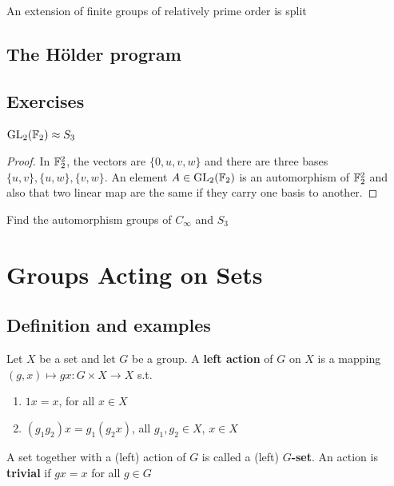 \documentclass[11pt]{article}
\begin{document}
\begin{theorem}
An extension of finite groups of relatively prime order is split
\end{theorem}
\subsection{The Hölder program}
\label{sec:org2b9131e}

\subsection{Exercises}
\label{sec:org59a980c}
\begin{exercise}
\label{ex3.3}
\(\operatorname{GL}_2(\mathbb{F}_2)\approx S_3\)
\end{exercise}

\begin{proof}
In \(\mathbb{F}_2^2\), the vectors are \(\{0,u,v,w\}\) and there are three bases \(\{u,v\},\{u,w\},\{v,w\}\). An
element \(A\in\operatorname{GL}_2(\mathbb{F}_2)\) is an automorphism of \(\mathbb{F}_2^2\) and also that two linear map are the same
if they carry one basis to another.
\end{proof}

\begin{exercise}
Find the automorphism groups of \(C_\infty\) and \(S_3\)
\end{exercise}

\section{Groups Acting on Sets}
\label{sec:orgae98b21}

\subsection{Definition and examples}
\label{sec:org4716f4c}
\begin{definition}[]
Let \(X\) be a set and let \(G\) be a group. A \textbf{left action} of \(G\) on \(X\) is a
mapping \((g,x)\mapsto gx:G\times X\to X\) s.t.
\begin{enumerate}
\item \(1x=x\), for all \(x\in X\)
\item \((g_1g_2)x=g_1(g_2x)\), all \(g_1,g_2\in X\), \(x\in X\)
\end{enumerate}


A set together with a (left) action of \(G\) is called a (left) \textbf{\(G\)-set}. An action is \textbf{trivial}
if \(gx=x\) for all \(g\in G\)
\end{definition}
\end{document}
